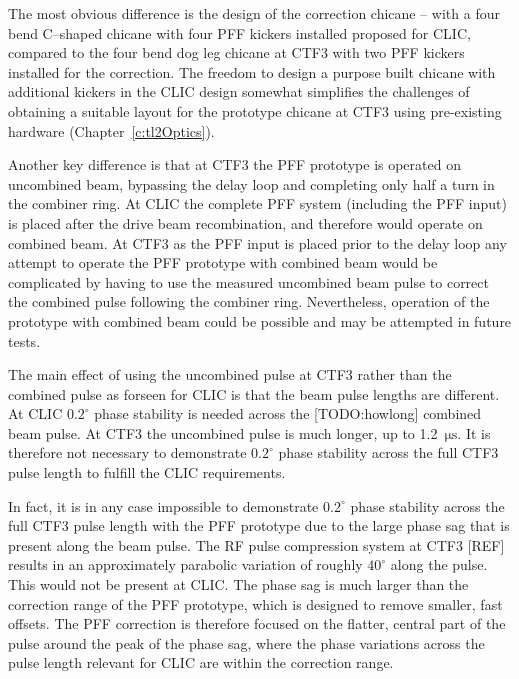 The most obvious difference is the design of the correction chicane -- with a four bend C--shaped chicane with four PFF kickers installed proposed for CLIC, compared to the four bend dog leg chicane at CTF3 with two PFF kickers installed for the correction. The freedom to design a purpose built chicane with additional kickers in the CLIC design somewhat simplifies the challenges of obtaining a suitable layout for the prototype chicane at CTF3 using pre-existing hardware (Chapter~\ref{c:tl2Optics}).

Another key difference is that at CTF3 the PFF prototype is operated on uncombined beam, bypassing the delay loop and completing only half a turn in the combiner ring. At CLIC the complete PFF system (including the PFF input) is placed after the drive beam recombination, and therefore would operate on combined beam. At CTF3 as the PFF input is placed prior to the delay loop any attempt to operate the PFF prototype with combined beam would be complicated by having to use the measured uncombined beam pulse to correct the combined pulse following the combiner ring. Nevertheless, operation of the prototype with combined beam could be possible and may be attempted in future tests.

The main effect of using the uncombined pulse at CTF3 rather than the combined pulse as forseen for CLIC is that the beam pulse lengths are different. At CLIC \(0.2^\circ\) phase stability is needed across the [TODO:howlong] combined beam pulse. At CTF3 the uncombined pulse is much longer, up to 1.2~\(\mathrm{\mu s}\). It is therefore not necessary to demonstrate \(0.2^\circ\) phase stability across the full CTF3 pulse length to fulfill the CLIC requirements.

In fact, it is in any case impossible to demonstrate \(0.2^\circ\) phase stability across the full CTF3 pulse length with the PFF prototype due to the large phase sag that is present along the beam pulse. The RF pulse compression system at CTF3 [REF] results in an approximately parabolic variation of roughly \(40^\circ\) along the pulse. This would not be present at CLIC. The phase sag is much larger than the correction range of the PFF prototype, which is designed to remove smaller, fast offsets. The PFF correction is therefore focused on the flatter, central part of the pulse around the peak of the phase sag, where the phase variations across the pulse length relevant for CLIC are within the correction range.



